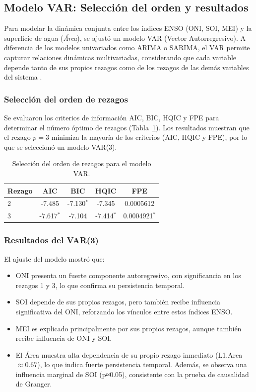 \subsection{Modelo VAR: Selección del orden y resultados}

Para modelar la dinámica conjunta entre los índices ENSO (ONI, SOI, MEI) y la superficie de agua (\textit{Área}), se ajustó un modelo VAR (Vector Autorregresivo). A diferencia de los modelos univariados como ARIMA o SARIMA, el VAR permite capturar relaciones dinámicas multivariadas, considerando que cada variable depende tanto de sus propios rezagos como de los rezagos de las demás variables del sistema \cite{lutkepohl2005new}.

\subsubsection{Selección del orden de rezagos}
Se evaluaron los criterios de información AIC, BIC, HQIC y FPE para determinar el número óptimo de rezagos (Tabla~\ref{tab:var_lags}). Los resultados muestran que el rezago $p=3$ minimiza la mayoría de los criterios (AIC, HQIC y FPE), por lo que se seleccionó un modelo VAR(3).

\begin{table}[H]
    \centering
    \caption{Selección del orden de rezagos para el modelo VAR.}
    \label{tab:var_lags}
    \begin{tabular}{lcccc}
        \toprule
        \textbf{Rezago} & \textbf{AIC} & \textbf{BIC} & \textbf{HQIC} & \textbf{FPE} \\
        \midrule
        2 & -7.485 & -7.130$^\ast$ & -7.345 & 0.0005612 \\
        3 & -7.617$^\ast$ & -7.104 & -7.414$^\ast$ & 0.0004921$^\ast$ \\
        \bottomrule
    \end{tabular}
\end{table}

\subsubsection{Resultados del VAR(3)}
El ajuste del modelo mostró que:

\begin{itemize}
    \item ONI presenta un fuerte componente autoregresivo, con significancia en los rezagos 1 y 3, lo que confirma su persistencia temporal.
    \item SOI depende de sus propios rezagos, pero también recibe influencia significativa del ONI, reforzando los vínculos entre estos índices ENSO.
    \item MEI es explicado principalmente por sus propios rezagos, aunque también recibe influencia de ONI y SOI.
    \item El Área muestra alta dependencia de su propio rezago inmediato (L1.Area $\approx 0.67$), lo que indica fuerte persistencia temporal. Además, se observa una influencia marginal de SOI (p≈0.05), consistente con la prueba de causalidad de Granger.
\end{itemize}

